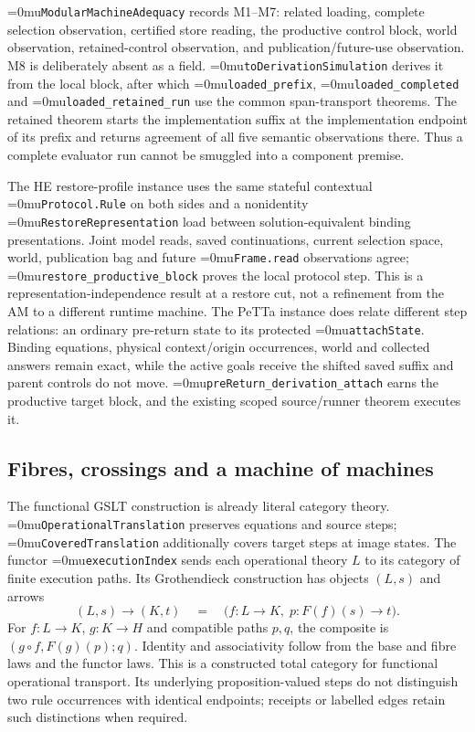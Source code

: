 \documentclass[11pt,a4paper]{article}
\newcommand{\name}[1]{\textup{\Urlmuskip=0mu\relax\nolinkurl{#1}}}
\begin{document}
\name{ModularMachineAdequacy} records M1--M7: related loading, complete
selection observation, certified store reading, the productive control block,
world observation, retained-control observation, and publication/future-use
observation.  M8 is deliberately absent as a field.
\name{toDerivationSimulation} derives it from the local block, after which
\name{loaded_prefix}, \name{loaded_completed} and
\name{loaded_retained_run} use the common span-transport theorems.  The retained
theorem starts the implementation suffix at the implementation endpoint of its
prefix and returns agreement of all five semantic observations there.  Thus a
complete evaluator run cannot be smuggled into a component premise.

The HE restore-profile instance uses the same stateful contextual
\name{Protocol.Rule} on both sides and a nonidentity
\name{RestoreRepresentation} load between solution-equivalent binding
presentations.  Joint model reads, saved continuations, current selection space,
world, publication bag and future \name{Frame.read} observations agree;
\name{restore_productive_block} proves the local protocol step.  This is a
representation-independence result at a restore cut, not a refinement from the
AM to a different runtime machine.  The PeTTa instance does relate different
step relations: an ordinary pre-return state to its protected
\name{attachState}.  Binding equations, physical
context/origin occurrences, world and collected answers remain exact, while
the active goals receive the shifted saved suffix and parent controls do not
move.  \name{preReturn_derivation_attach} earns the productive target block,
and the existing scoped source/runner theorem executes it.

\subsection{Fibres, crossings and a machine of machines}

The functional GSLT construction is already literal category theory.
\name{OperationalTranslation} preserves equations and source steps;
\name{CoveredTranslation} additionally covers target steps at image states.
The functor \name{executionIndex} sends each operational theory $L$ to its
category of finite execution paths. Its Grothendieck construction has objects
$(L,s)$ and arrows
\[
 (L,s)\longrightarrow(K,t)
 \quad=\quad
 \bigl(f:L\to K,\;p:F(f)(s)\longrightarrow t\bigr).
\]
For $f:L\to K$, $g:K\to H$ and compatible paths $p,q$, the composite is
$(g\circ f,F(g)(p);q)$. Identity and associativity follow from the base and
fibre laws and the functor laws. This is a constructed total category for
functional operational transport. Its underlying proposition-valued steps do
not distinguish two rule occurrences with identical endpoints; receipts or
labelled edges retain such distinctions when required.
\end{document}
